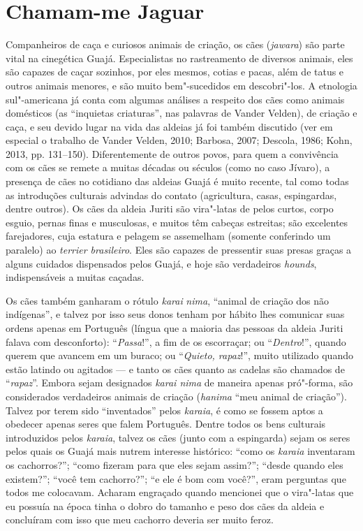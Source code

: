 \section{Chamam-me Jaguar}

Companheiros de caça e curiosos animais de criação, os cães
(\emph{jawara}) são parte vital na cinegética Guajá. Especialistas no
rastreamento de diversos animais, eles são capazes de caçar sozinhos,
por eles mesmos, cotias e pacas, além de tatus e outros animais menores,
e são muito bem"-sucedidos em descobri"-los. A etnologia sul"-americana já
conta com algumas análises a respeito dos cães como animais domésticos
(as ``inquietas criaturas'', nas palavras de Vander Velden), de criação e
caça, e seu devido lugar na vida das aldeias já foi também discutido
(ver em especial o trabalho de Vander Velden, 2010; Barbosa, 2007;
Descola, 1986; Kohn, 2013, pp. 131--150). Diferentemente de outros povos,
para quem a convivência com os cães se remete a muitas décadas ou
séculos (como no caso Jívaro), a presença de cães no cotidiano das
aldeias Guajá é muito recente, tal como todas as introduções culturais
advindas do contato (agricultura, casas, espingardas, dentre outros). Os
cães da aldeia Juriti são vira"-latas de pelos curtos, corpo esguio,
pernas finas e musculosas, e muitos têm cabeças estreitas; são
excelentes farejadores, cuja estatura e pelagem se assemelham (somente
conferindo um paralelo) ao \emph{terrier brasileiro}. Eles são capazes
de pressentir suas presas graças a alguns cuidados dispensados pelos
Guajá, e hoje são verdadeiros \emph{hounds}, indispensáveis a muitas
caçadas.

Os cães também ganharam o rótulo \emph{karai} \emph{nima}, ``animal de
criação dos não indígenas'', e talvez por isso seus donos tenham por
hábito lhes comunicar suas ordens apenas em Português (língua que a
maioria das pessoas da aldeia Juriti falava com desconforto):
``\emph{Passa}!'', a fim de os escorraçar; ou ``\emph{Dentro}!'', quando
querem que avancem em um buraco; ou ``\emph{Quieto, rapaz}!'', muito
utilizado quando estão latindo ou agitados --- e tanto os cães quanto as
cadelas são chamados de ``\emph{rapaz}''. Embora sejam designados
\emph{karai nima} de maneira apenas pró"-forma, são considerados
verdadeiros animais de criação (\emph{hanima} ``meu animal de
criação''). Talvez por terem sido ``inventados'' pelos \emph{karaia}, é
como se fossem aptos a obedecer apenas seres que falem Português. Dentre
todos os bens culturais introduzidos pelos \emph{karaia}, talvez os cães
(junto com a espingarda) sejam os seres pelos quais os Guajá mais nutrem
interesse histórico: ``como os \emph{karaia} inventaram os cachorros?'';
``como fizeram para que eles sejam assim?''; ``desde quando eles existem?'';
``você tem cachorro?''; ``e ele é bom com você?'', eram perguntas que todos
me colocavam. Acharam engraçado quando mencionei que o vira"-latas que eu
possuía na época tinha o dobro do tamanho e peso dos cães da aldeia e
concluíram com isso que meu cachorro deveria ser muito feroz.


